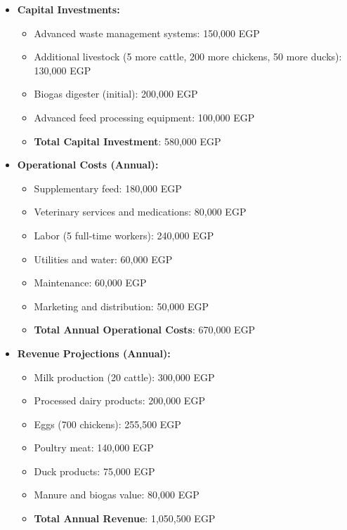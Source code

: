 \begin{itemize}
    \item \textbf{Capital Investments:}
    \begin{itemize}
        \item Advanced waste management systems: 150,000 EGP
        \item Additional livestock (5 more cattle, 200 more chickens, 50 more ducks): 130,000 EGP
        \item Biogas digester (initial): 200,000 EGP
        \item Advanced feed processing equipment: 100,000 EGP
        \item \textbf{Total Capital Investment}: 580,000 EGP
    \end{itemize}
    
    \item \textbf{Operational Costs (Annual):}
    \begin{itemize}
        \item Supplementary feed: 180,000 EGP
        \item Veterinary services and medications: 80,000 EGP
        \item Labor (5 full-time workers): 240,000 EGP
        \item Utilities and water: 60,000 EGP
        \item Maintenance: 60,000 EGP
        \item Marketing and distribution: 50,000 EGP
        \item \textbf{Total Annual Operational Costs}: 670,000 EGP
    \end{itemize}
    
    \item \textbf{Revenue Projections (Annual):}
    \begin{itemize}
        \item Milk production (20 cattle): 300,000 EGP
        \item Processed dairy products: 200,000 EGP
        \item Eggs (700 chickens): 255,500 EGP
        \item Poultry meat: 140,000 EGP
        \item Duck products: 75,000 EGP
        \item Manure and biogas value: 80,000 EGP
        \item \textbf{Total Annual Revenue}: 1,050,500 EGP
    \end{itemize}
    

\end{itemize}

